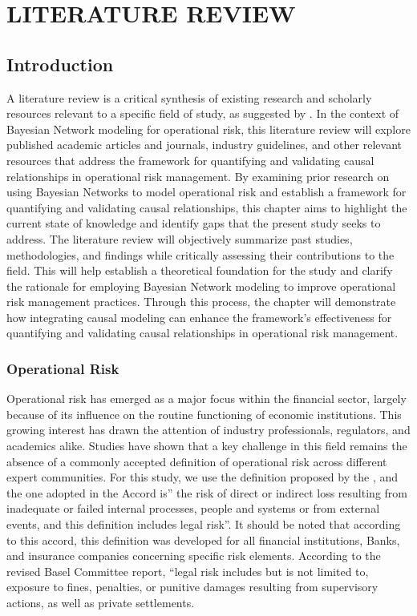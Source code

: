 \chapter{LITERATURE REVIEW}
\section{Introduction}
A literature review is a critical synthesis of existing research and scholarly resources relevant to a specific field of study, as suggested by \parencite{walker2010systematic}. In the context of Bayesian Network modeling for operational risk, this literature review will explore published academic articles and journals, industry guidelines, and other relevant resources that address the framework for quantifying and validating causal relationships in operational risk management. By examining prior research on using Bayesian Networks to model operational risk and establish a framework for quantifying and validating causal relationships, this chapter aims to highlight the current state of knowledge and identify gaps that the present study seeks to address. The literature review will objectively summarize past studies, methodologies, and findings while critically assessing their contributions to the field. This will help establish a theoretical foundation for the study and clarify the rationale for employing Bayesian Network modeling to improve operational risk management practices. Through this process, the chapter will demonstrate how integrating causal modeling can enhance the framework's effectiveness for quantifying and validating causal relationships in operational risk management.
\subsection{Operational Risk}
Operational risk has emerged as a major focus within the financial sector, largely because of its influence on the routine functioning of economic institutions. This growing interest has drawn the attention of industry professionals, regulators, and academics alike. Studies have shown that a key challenge in this field remains the absence of a commonly accepted definition of operational risk across different expert communities. For this study, we use the definition proposed by the \textcite{bcbs2020operationalrisk}, and the one adopted in the Accord is” the risk of direct or indirect loss resulting from inadequate or failed internal processes, people and systems or from external events, and this definition includes legal risk”.  It should be noted that according to this accord, this definition was developed for all financial institutions, Banks, and insurance companies concerning specific risk elements. According to the revised Basel Committee report, “legal risk includes but is not limited to, exposure to fines, penalties, or punitive damages resulting from supervisory actions, as well as private settlements.

